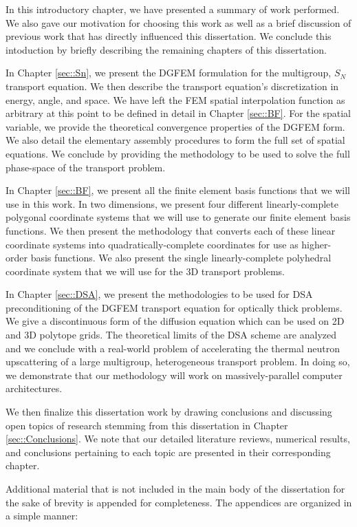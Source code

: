 In this introductory chapter, we have presented a summary of work performed. We also gave our motivation for choosing this work as well as a brief discussion of previous work that has directly influenced this dissertation. We conclude this intoduction by briefly describing the remaining chapters of this dissertation.

In Chapter \ref{sec::Sn}, we present the DGFEM formulation for the multigroup, $S_N$ transport equation. We then describe the transport equation's discretization in energy, angle, and space. We have left the FEM spatial interpolation function as arbitrary at this point to be defined in detail in Chapter \ref{sec::BF}. For the spatial variable, we provide the theoretical convergence properties of the DGFEM form. We also detail the elementary assembly procedures to form the full set of spatial equations. We conclude by providing the methodology to be used to solve the full phase-space of the transport problem.

In Chapter \ref{sec::BF}, we present all the finite element basis functions that we will use in this work. In two dimensions, we present four different linearly-complete polygonal coordinate systems that we will use to generate our finite element basis functions. We then present the methodology that converts each of these linear coordinate systems into quadratically-complete coordinates for use as higher-order basis functions. We also present the single linearly-complete polyhedral coordinate system that we will use for the 3D transport problems.

In Chapter \ref{sec::DSA}, we present the methodologies to be used for DSA preconditioning of the DGFEM transport equation for optically thick problems. We give a discontinuous form of the diffusion equation which can be used on 2D and 3D polytope grids. The theoretical limits of the DSA scheme are analyzed and we conclude with a real-world problem of accelerating the thermal neutron upscattering of a large multigroup, heterogeneous transport problem. In doing so, we demonstrate that our methodology will work on massively-parallel computer architectures.

We then finalize this dissertation work by drawing conclusions and discussing open topics of research stemming from this dissertation in Chapter \ref{sec::Conclusions}. We note that our detailed literature reviews, numerical results, and conclusions pertaining to each topic are presented in their corresponding chapter.

Additional material that is not included in the main body of the dissertation for the sake of brevity is appended for completeness. The appendices are organized in a simple manner:


